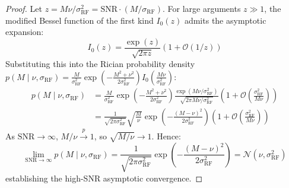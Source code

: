 \documentclass{article}
\begin{document}
\begin{proof}
Let $z = M \nu / \sigma_{\text{RF}}^2 = \text{SNR} \cdot (M / \sigma_{\text{RF}})$. For large arguments $z \gg 1$, the modified Bessel function of the first kind $I_0(z)$ admits the asymptotic expansion:
\begin{equation}
    I_0(z) = \frac{\exp(z)}{\sqrt{2\pi z}} \left( 1 + \mathcal{O}(1/z) \right)
\end{equation}
Substituting this into the Rician probability density $p(M \mid \nu, \sigma_{\text{RF}}) = \frac{M}{\sigma_{\text{RF}}^2} \exp\left(-\frac{M^2 + \nu^2}{2\sigma_{\text{RF}}^2}\right) I_0\left(\frac{M\nu}{\sigma_{\text{RF}}^2}\right)$:
\begin{align}
    p(M \mid \nu, \sigma_{\text{RF}}) &= \frac{M}{\sigma_{\text{RF}}^2} \exp\left(-\frac{M^2 + \nu^2}{2\sigma_{\text{RF}}^2}\right) \frac{\exp(M\nu / \sigma_{\text{RF}}^2)}{\sqrt{2\pi M\nu / \sigma_{\text{RF}}^2}} \left( 1 + \mathcal{O}\left(\frac{\sigma_{\text{RF}}^2}{M\nu}\right) \right) \\
    &= \frac{1}{\sqrt{2\pi \sigma_{\text{RF}}^2}} \sqrt{\frac{M}{\nu}} \exp\left( - \frac{(M - \nu)^2}{2\sigma_{\text{RF}}^2} \right) \left( 1 + \mathcal{O}\left(\frac{\sigma_{\text{RF}}^2}{M\nu}\right) \right)
\end{align}
As $\text{SNR} \to \infty$, $M / \nu \xrightarrow{p} 1$, so $\sqrt{M/\nu} \to 1$. Hence:
\begin{equation}
    \lim_{\text{SNR} \to \infty} p(M \mid \nu, \sigma_{\text{RF}}) = \frac{1}{\sqrt{2\pi \sigma_{\text{RF}}^2}} \exp\left( - \frac{(M - \nu)^2}{2\sigma_{\text{RF}}^2} \right) = \mathcal{N}(\nu, \sigma_{\text{RF}}^2)
\end{equation}
establishing the high-SNR asymptotic convergence.
\end{proof}

% 
\end{document}
